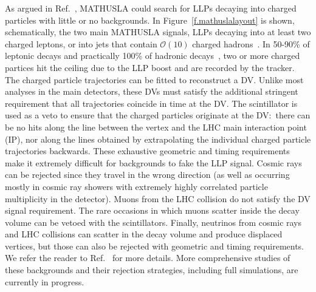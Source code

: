 As argued in Ref.~\cite{Chou:2016lxi}, MATHUSLA could search for LLPs decaying into charged particles with little or no backgrounds.
%
In Figure~\ref{f.mathuslalayout} is shown, schematically, the two main MATHUSLA signals, LLPs decaying into at least two charged leptons, or into jets that contain $\mathcal{O}(10)$ charged hadrons~\cite{Curtin:2017izq}.
In 50-90\% of leptonic decays and practically 100\% of hadronic decays~\cite{Curtin:2017izq}, two or more charged partices hit the ceiling due to the LLP boost and are recorded by the tracker. The charged particle trajectories can be fitted to reconstruct a DV.
%
Unlike most analyses in the main detectors, these DVs must satisfy the additional stringent requirement that all trajectories coincide in time at the DV.
%
The scintillator is used as a veto to ensure that the charged particles originate at the DV:~there can be no hits along the line between the vertex and the LHC main interaction point (IP), nor along the lines obtained by extrapolating the individual charged particle trajectories backwards.
%
These exhaustive geometric and timing requirements make it extremely difficult for backgrounds to fake the LLP signal.
%
Cosmic rays can be rejected since they travel in the wrong direction (as well as occurring mostly in cosmic ray showers with extremely highly correlated particle multiplicity in the detector).
%
Muons from the LHC collision do not satisfy the DV signal requirement. The rare occasions in which muons scatter inside the decay volume can be vetoed with the scintillators.
%
Finally, neutrinos from cosmic rays and LHC collisions can scatter in the decay volume and produce displaced vertices, but those can also be rejected with geometric and timing requirements. We refer the reader to Ref.~\cite{Chou:2016lxi} for more details.
%
More comprehensive studies of these backgrounds and their rejection strategies, including full simulations, are currently in progress.

